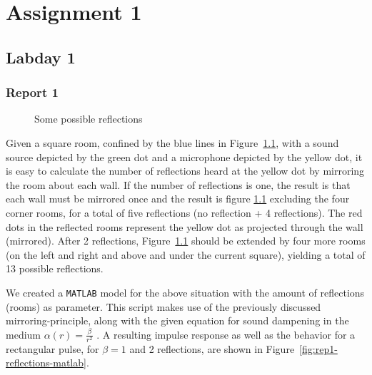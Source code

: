 \documentclass[11pt,titlepage]{report}
\begin{document}
\chapter{Assignment 1}
\section{Labday 1}
\subsection{Report 1}

\begin{figure}[H]
	\centering
	
	\caption{Some possible reflections}
	\label{fig:rep1-reflections-ill}
\end{figure}

Given a square room, confined by the blue lines in Figure~\ref{fig:rep1-reflections-ill}, with a sound source depicted by the green dot and a microphone depicted by the yellow dot, it is easy to calculate the number of reflections heard at the yellow dot by mirroring the room about each wall. If the number of reflections is one, the result is that each wall must be mirrored once and the result is figure \ref{fig:rep1-reflections-ill} excluding the four corner rooms, for a total of five reflections (no reflection + 4 reflections). The red dots in the reflected rooms represent the yellow dot as projected through the wall (mirrored). After 2 reflections, Figure~\ref{fig:rep1-reflections-ill} should be extended by four more rooms (on the left and right and above and under the current square), yielding a total of 13 possible reflections.


We created a \texttt{MATLAB} model for the above situation with the amount of reflections (rooms) as parameter. This script makes use of the previously discussed mirroring-principle, along with the given equation for sound dampening in the medium $\alpha(r) = \frac{\beta}{r^2}$ \cite[91]{epo4-manual}. A resulting impulse response as well as the behavior for a rectangular pulse, for $\beta = 1$ and 2 reflections, are shown in Figure~\ref{fig:rep1-reflections-matlab}.
\end{document}
